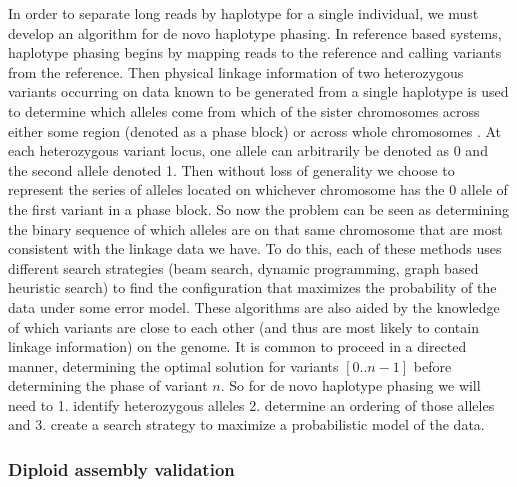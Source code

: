 In order to separate long reads by haplotype for a single individual, we must develop an algorithm for de novo haplotype phasing. In reference based systems, haplotype 
phasing begins by mapping reads to the reference and calling variants from the reference. Then physical linkage information of two heterozygous variants occurring 
on data known to be generated from a single haplotype is used to determine which alleles come from which of the sister chromosomes across 
either some region (denoted as a phase block) or 
across whole chromosomes \cite{10xlinked} \cite{whatshap} \cite{hapcut2} \cite{hapchat}. At each heterozygous variant locus, one allele can arbitrarily be denoted as 0 and 
the second allele denoted 1. Then without loss of generality we choose to represent the series of alleles located on whichever chromosome has the 0 allele of the first variant in 
a phase block. So now the problem can be seen as determining the binary sequence of which alleles are on that same chromosome that are most consistent 
with the linkage data we have. To do this, each of these methods uses different search strategies (beam search, dynamic programming, graph based heuristic search) to find the 
configuration that maximizes the probability of the data under some error model. These algorithms are also aided by the knowledge of which variants are close to each other (and 
thus are most likely to contain linkage information) on the genome. It is common to proceed in a directed manner, determining the optimal solution for variants $[0..n-1]$ before 
determining the phase of variant $n$. So for de novo haplotype phasing we will need to 1. identify heterozygous alleles 2. determine an ordering of those alleles and 3. create a 
search strategy to maximize a probabilistic model of the data. 



\subsubsection{Diploid assembly validation}

